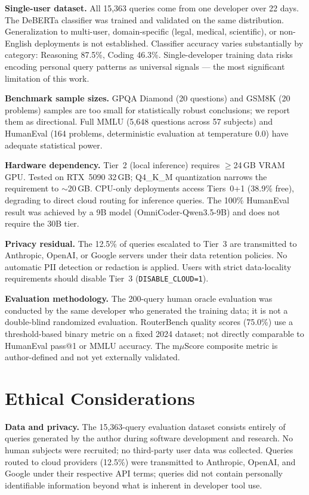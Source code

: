 \documentclass[11pt]{article}
\begin{document}
\textbf{Single-user dataset.} All 15,363 queries come from one developer
over 22 days. The DeBERTa classifier was trained and validated on the
same distribution. Generalization to multi-user, domain-specific
(legal, medical, scientific), or non-English deployments is not
established. Classifier accuracy varies substantially by category:
Reasoning 87.5\%, Coding 46.3\%. Single-developer training data risks
encoding personal query patterns as universal signals --- the most
significant limitation of this work.

\textbf{Benchmark sample sizes.} GPQA Diamond (20 questions) and GSM8K
(20 problems) samples are too small for statistically robust conclusions;
we report them as directional. Full MMLU (5,648 questions across 57
subjects) and HumanEval (164 problems, deterministic evaluation at
temperature 0.0) have adequate statistical power.

\textbf{Hardware dependency.} Tier~2 (local inference) requires
$\geq$24\,GB VRAM GPU. Tested on RTX~5090 32\,GB; Q4\_K\_M
quantization narrows the requirement to $\sim$20\,GB. CPU-only
deployments access Tiers~0+1 (38.9\% free), degrading to direct cloud
routing for inference queries. The 100\% HumanEval result was achieved
by a 9B model (OmniCoder-Qwen3.5-9B) and does not require the 30B tier.

\textbf{Privacy residual.} The 12.5\% of queries escalated to Tier~3
are transmitted to Anthropic, OpenAI, or Google servers under their
data retention policies. No automatic PII detection or redaction is
applied. Users with strict data-locality requirements should disable
Tier~3 (\texttt{DISABLE\_CLOUD=1}).

\textbf{Evaluation methodology.} The 200-query human oracle evaluation
was conducted by the same developer who generated the training data; it
is not a double-blind randomized evaluation. RouterBench quality scores
(75.0\%) use a threshold-based binary metric on a fixed 2024 dataset;
not directly comparable to HumanEval pass@1 or MMLU accuracy. The
m$\mu$Score composite metric is author-defined and not yet externally
validated.

\section*{Ethical Considerations}

\textbf{Data and privacy.} The 15,363-query evaluation dataset consists
entirely of queries generated by the author during software development
and research. No human subjects were recruited; no third-party user data
was collected. Queries routed to cloud providers (12.5\%) were
transmitted to Anthropic, OpenAI, and Google under their respective API
terms; queries did not contain personally identifiable information
beyond what is inherent in developer tool use.
\end{document}
